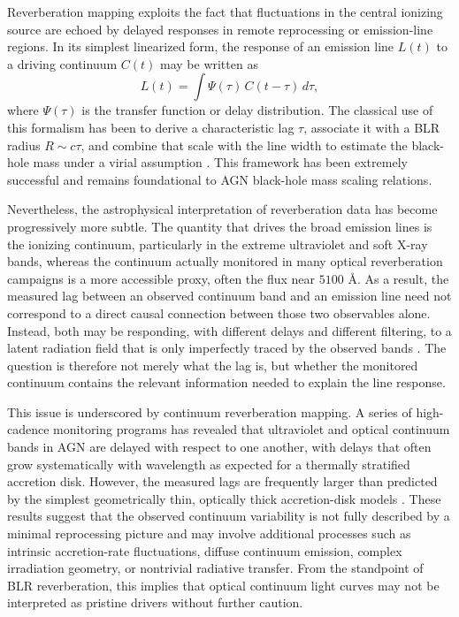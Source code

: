 \documentclass[12pt, a4paper]{article}
\begin{document}
Reverberation mapping exploits the fact that fluctuations in the central ionizing source are echoed by delayed responses in remote reprocessing or emission-line regions. In its simplest linearized form, the response of an emission line \(L(t)\) to a driving continuum \(C(t)\) may be written as
\begin{equation}
L(t) = \int \Psi(\tau)\,C(t-\tau)\,d\tau,
\end{equation}
where \(\Psi(\tau)\) is the transfer function or delay distribution. The classical use of this formalism has been to derive a characteristic lag \(\tau\), associate it with a BLR radius \(R \sim c\tau\), and combine that scale with the line width to estimate the black-hole mass under a virial assumption \cite{Peterson2004,BentzKatz2015}. This framework has been extremely successful and remains foundational to AGN black-hole mass scaling relations.

Nevertheless, the astrophysical interpretation of reverberation data has become progressively more subtle. The quantity that drives the broad emission lines is the ionizing continuum, particularly in the extreme ultraviolet and soft X-ray bands, whereas the continuum actually monitored in many optical reverberation campaigns is a more accessible proxy, often the flux near \(5100\) \AA. As a result, the measured lag between an observed continuum band and an emission line need not correspond to a direct causal connection between those two observables alone. Instead, both may be responding, with different delays and different filtering, to a latent radiation field that is only imperfectly traced by the observed bands \cite{Cackett2021}. The question is therefore not merely what the lag is, but whether the monitored continuum contains the relevant information needed to explain the line response.

This issue is underscored by continuum reverberation mapping. A series of high-cadence monitoring programs has revealed that ultraviolet and optical continuum bands in AGN are delayed with respect to one another, with delays that often grow systematically with wavelength as expected for a thermally stratified accretion disk. However, the measured lags are frequently larger than predicted by the simplest geometrically thin, optically thick accretion-disk models \cite{Fausnaugh2016,Fausnaugh2017,Edelson2019,Cackett2021}. These results suggest that the observed continuum variability is not fully described by a minimal reprocessing picture and may involve additional processes such as intrinsic accretion-rate fluctuations, diffuse continuum emission, complex irradiation geometry, or nontrivial radiative transfer. From the standpoint of BLR reverberation, this implies that optical continuum light curves may not be interpreted as pristine drivers without further caution.
\end{document}
